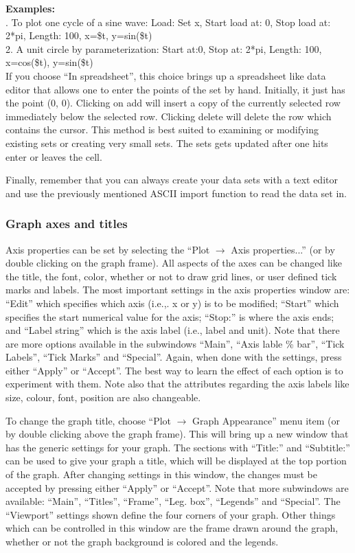 \documentclass[byrevtex,amssymb,aps,pra,floatfix,letterpaper]{revtex4}
\begin{document}
\noindent
\textbf{Examples:}\\

. To plot one cycle of a sine wave: Load: Set x, Start load at: 0, Stop load at: 2*pi, Length: 100, x=\$t, y=sin(\$t)\\
2. A unit circle by parameterization: Start at:0, Stop at: 2*pi, Length: 100, x=cos(\$t), y=sin(\$t)\\

If you choose ``In spreadsheet'', this choice brings up a spreadsheet like data editor that allows one to enter the points of the set by hand. Initially, it just has the point (0, 0). Clicking on add will insert a copy of the currently selected row immediately below the selected row. Clicking delete will delete the row which contains the cursor. This method is best suited to examining or modifying existing sets or creating very small sets. The sets gets updated after one hits enter or leaves the cell.

Finally, remember that you can always create your data sets with a text editor and use the previously mentioned ASCII import function to read the data set in.

\subsubsection{Graph axes and titles}

Axis properties can be set by selecting the ``Plot $\rightarrow$ Axis properties...'' (or by double clicking on the graph frame). 
All aspects of the axes can be changed like the title, the font, color, whether or not to draw grid lines, or user defined tick marks and labels. The most important settings in the axis properties window are: ``Edit'' which specifies which axis (i.e.,. x or y) is to be modified; ``Start'' which specifies the start numerical value for the axis; ``Stop:'' is where the axis ends; and ``Label string'' which is the axis label (i.e., label and unit). Note that there are more options available in the subwindows ``Main'', ``Axis lable \% bar'', ``Tick Labels'', ``Tick Marks'' and ``Special''. Again, when done with the settings, press either ``Apply'' or ``Accept''. The best way to learn the effect of each option is to experiment with them. Note also that the attributes regarding the axis labels like size, colour, font, position are also changeable.

To change the graph title, choose ``Plot $\rightarrow$ Graph Appearance'' menu item (or by double clicking above the graph frame). This will bring up a new window that has the generic settings for your graph. The sections with ``Title:'' and ``Subtitle:'' can be used to give your graph a title, which will be displayed at the top portion of the graph. After changing settings in this window, the changes must be accepted by pressing either ``Apply'' or ``Accept''. Note that more subwindows are available: ``Main'', ``Titles'', ``Frame'', ``Leg. box'', ``Legends'' and ``Special''. The ``Viewport'' settings shown define the four corners of your graph. Other things which can be controlled in this window are the frame drawn around the graph, whether or not the graph background is colored and the legends. 
\end{document}
